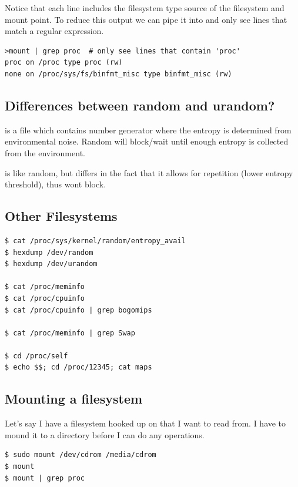 Notice that each line includes the filesystem type source of the filesystem and mount point. To reduce this output we can pipe it into  and only see lines that match a regular expression.

\begin{lstlisting}
>mount | grep proc  # only see lines that contain 'proc'
proc on /proc type proc (rw)
none on /proc/sys/fs/binfmt_misc type binfmt_misc (rw)
\end{lstlisting}

\subsection{Differences between random and urandom?}\label{differences-between-random-and-urandom}

 is a file which contains number generator where the entropy is determined from environmental noise. Random will block/wait until enough entropy is collected from the environment.

 is like random, but differs in the fact that it allows for repetition (lower entropy threshold), thus wont block.

\subsection{Other Filesystems}\label{other-filesystems}

\begin{lstlisting}
$ cat /proc/sys/kernel/random/entropy_avail
$ hexdump /dev/random
$ hexdump /dev/urandom

$ cat /proc/meminfo
$ cat /proc/cpuinfo
$ cat /proc/cpuinfo | grep bogomips

$ cat /proc/meminfo | grep Swap

$ cd /proc/self
$ echo $$; cd /proc/12345; cat maps
\end{lstlisting}

\subsection{Mounting a filesystem}\label{mounting-a-filesystem}

Let's say I have a filesystem hooked up on  that I want to read from. I have to mound it to a directory before I can do any operations.

\begin{lstlisting}
$ sudo mount /dev/cdrom /media/cdrom
$ mount
$ mount | grep proc
\end{lstlisting}


